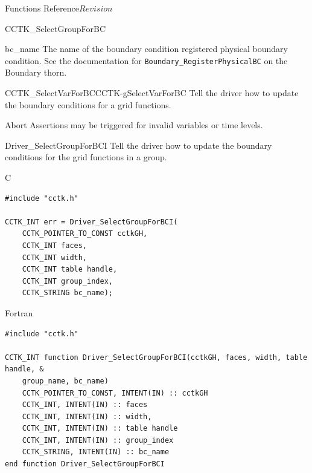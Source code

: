 \begin{cactuspart}{ Functions Reference}{}{$Revision$}
\begin{FunctionDescription}{CCTK\_SelectGroupForBC}
\begin{ParameterSection}
\begin{Parameter}{bc\_name}
The name of the boundary condition registered physical boundary condition.
See the documentation for \texttt{Boundary\_RegisterPhysicalBC} on the
Boundary thorn.
\end{Parameter}
\end{ParameterSection}

\begin{SeeAlsoSection}
\begin{SeeAlso2}{CCTK\_SelectVarForBC}{CCTK-gSelectVarForBC}
Tell the driver how to update the boundary conditions for a grid functions.
\end{SeeAlso2}
\end{SeeAlsoSection}

\begin{ErrorSection}
\begin{Error}{Abort}
Assertions may be triggered for invalid variables or time levels.
\end{Error}
\end{ErrorSection}
\end{FunctionDescription}

\begin{FunctionDescription}{Driver\_SelectGroupForBCI}
\label{Driver-SelectGroupForBCI}
Tell the driver how to update the boundary conditions for the grid functions in a group.
\begin{SynopsisSection}
\begin{Synopsis}{C}
\begin{verbatim}
#include "cctk.h"

CCTK_INT err = Driver_SelectGroupForBCI(
    CCTK_POINTER_TO_CONST cctkGH,
    CCTK_INT faces,
    CCTK_INT width,
    CCTK_INT table handle,
    CCTK_INT group_index,
    CCTK_STRING bc_name);

\end{verbatim}
\end{Synopsis}
\begin{Synopsis}{Fortran}
\begin{verbatim}
#include "cctk.h"

CCTK_INT function Driver_SelectGroupForBCI(cctkGH, faces, width, table handle, &
    group_name, bc_name)
    CCTK_POINTER_TO_CONST, INTENT(IN) :: cctkGH
    CCTK_INT, INTENT(IN) :: faces
    CCTK_INT, INTENT(IN) :: width,
    CCTK_INT, INTENT(IN) :: table handle
    CCTK_INT, INTENT(IN) :: group_index
    CCTK_STRING, INTENT(IN) :: bc_name
end function Driver_SelectGroupForBCI
\end{verbatim}
\end{Synopsis}
\end{SynopsisSection}


\end{FunctionDescription}
\end{cactuspart}
